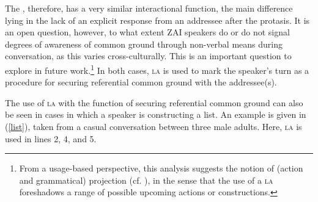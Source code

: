 The , therefore, has a very similar interactional function, the main difference lying in the lack of an explicit response from an addressee after the protasis. It is an open question, however, to what extent ZAI speakers do or do not signal degrees of awareness of common ground through non-verbal means during conversation, as this varies cross-culturally. This is an important question to explore in future work.\footnote{From a usage-based perspective, this analysis suggests the notion of (action and grammatical) projection (cf. \citealt{auer2005}), in the sense that the use of a \textsc{la} foreshadows a range of possible upcoming actions or constructions.} In both cases, \textsc{la} is used to mark the speaker's turn as a procedure for securing referential common ground with the addressee(s). 

The use of \textsc{la} with the function of securing referential common ground can also be seen in cases in which a speaker is constructing a list. An example is given in (\ref{list}), taken from a casual conversation between three male adults. Here, \textsc{la} is used in lines 2, 4, and 5. 

